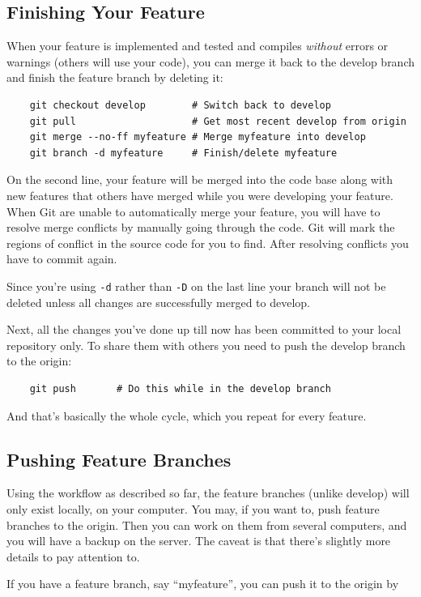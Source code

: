 \documentclass[10pt,a4paper]{article}
\begin{document}
\subsection{Finishing Your Feature}
When your feature is implemented and tested and compiles \emph{without} errors or warnings (others will use your code), you can merge it back to the develop branch and finish the feature branch by deleting it:

\begin{verbatim}
	git checkout develop        # Switch back to develop
	git pull                    # Get most recent develop from origin
	git merge --no-ff myfeature # Merge myfeature into develop
	git branch -d myfeature     # Finish/delete myfeature
\end{verbatim}
On the second line, your feature will be merged into the code base along with new features that others have merged while you were developing your feature. When Git are unable to automatically merge your feature, you will have to resolve merge conflicts by manually going through the code. Git will mark the regions of conflict in the source code for you to find. After resolving conflicts you have to commit again.

Since you're using \verb$-d$ rather than \verb$-D$ on the last line your branch will not be deleted unless all changes are successfully merged to develop.

Next, all the changes you've done up till now has been committed to your local repository only. To share them with others you need to push the develop branch to the origin:

\begin{verbatim}
	git push	   # Do this while in the develop branch
\end{verbatim}
And that's basically the whole cycle, which you repeat for every feature.

\subsection{Pushing Feature Branches}
Using the workflow as described so far, the feature branches (unlike develop) will only exist locally, on your computer. You may, if you want to, push feature branches to the origin. Then you can work on them from several computers, and you will have a backup on the server. The caveat is that there's slightly more details to pay attention to.

If you have a feature branch, say ``myfeature'', you can push it to the origin by
\end{document}
